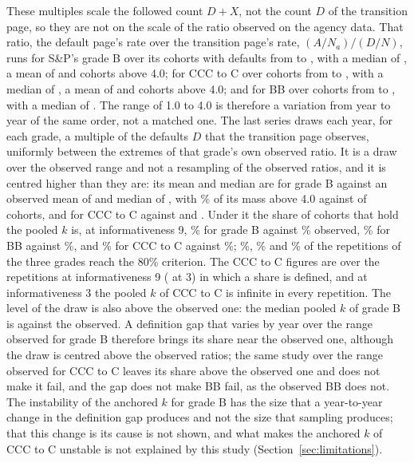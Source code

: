 These multiples scale the followed count $D+X$, not the count $D$ of the transition page, so they are not on the scale of the ratio observed on the agency data. That ratio, the default page's rate over the transition page's rate, $(A/N_a)/(D/N)$, runs for S\&P's grade B over its  cohorts with defaults from  to , with a median of , a mean of  and  cohorts above 4.0; for CCC to C over  cohorts from  to , with a median of , a mean of  and  cohorts above 4.0; and for BB over  cohorts from  to , with a median of . The range of 1.0 to 4.0 is therefore a variation from year to year of the same order, not a matched one. The last series draws each year, for each grade, a multiple of the defaults $D$ that the transition page observes, uniformly between the extremes of that grade's own observed ratio. It is a draw over the observed range and not a resampling of the observed ratios, and it is centred higher than they are: its mean and median are  for grade B against an observed mean of  and median of , with \% of its mass above 4.0 against  of  cohorts, and  for CCC to C against  and . Under it the share of cohorts that hold the pooled $k$ is, at informativeness 9, \% for grade B against \% observed, \% for BB against \%, and \% for CCC to C against \%; \%, \% and \% of the repetitions of the three grades reach the 80\% criterion. The CCC to C figures are over the  repetitions at informativeness 9 ( at 3) in which a share is defined, and at informativeness 3 the pooled $k$ of CCC to C is infinite in every repetition. The level of the draw is also above the observed one: the median pooled $k$ of grade B is  against the  observed. A definition gap that varies by year over the range observed for grade B therefore brings its share near the observed one, although the draw is centred above the observed ratios; the same study over the range observed for CCC to C leaves its share above the observed one and does not make it fail, and the gap does not make BB fail, as the observed BB does not. The instability of the anchored $k$ for grade B has the size that a year-to-year change in the definition gap produces and not the size that sampling produces; that this change is its cause is not shown, and what makes the anchored $k$ of CCC to C unstable is not explained by this study (Section~\ref{sec:limitations}).

